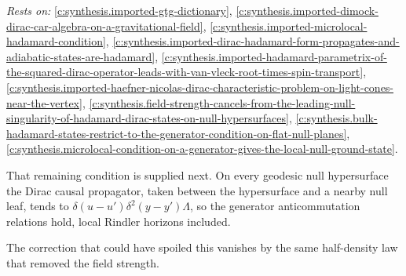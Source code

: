 \documentclass[11pt]{article}
\theoremstyle{definition}
\theoremstyle{plain}
\begin{document}
\noindent\emph{Rests on:} \ref{c:synthesis.imported-gtg-dictionary}, \ref{c:synthesis.imported-dimock-dirac-car-algebra-on-a-gravitational-field}, \ref{c:synthesis.imported-microlocal-hadamard-condition}, \ref{c:synthesis.imported-dirac-hadamard-form-propagates-and-adiabatic-states-are-hadamard}, \ref{c:synthesis.imported-hadamard-parametrix-of-the-squared-dirac-operator-leads-with-van-vleck-root-times-spin-transport}, \ref{c:synthesis.imported-haefner-nicolas-dirac-characteristic-problem-on-light-cones-near-the-vertex}, \ref{c:synthesis.field-strength-cancels-from-the-leading-null-singularity-of-hadamard-dirac-states-on-null-hypersurfaces}, \ref{c:synthesis.bulk-hadamard-states-restrict-to-the-generator-condition-on-flat-null-planes}, \ref{c:synthesis.microlocal-condition-on-a-generator-gives-the-local-null-ground-state}.

That remaining condition is supplied next. On every geodesic null hypersurface the Dirac causal propagator, taken between the hypersurface and a nearby null leaf, tends to $\delta(u - u')\delta^{2}(y - y')\Lambda$, so the generator anticommutation relations hold, local Rindler horizons included.

The correction that could have spoiled this vanishes by the same half-density law that removed the field strength.
\end{document}
